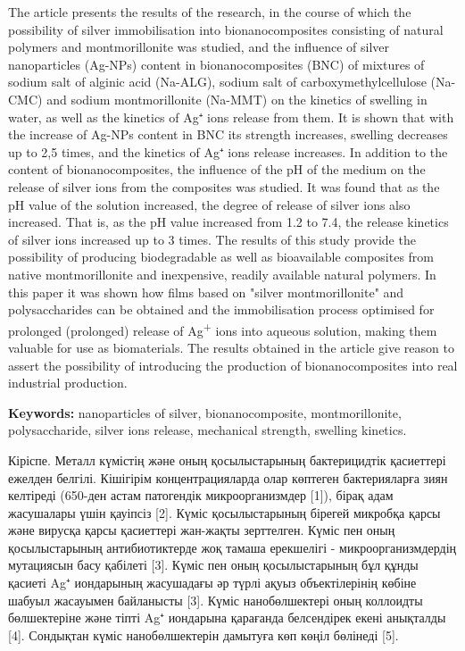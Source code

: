 The article presents the results of the research, in the course of which
the possibility of silver immobilisation into bionanocomposites
consisting of natural polymers and montmorillonite was studied, and the
influence of silver nanoparticles (Ag-NPs) content in bionanocomposites
(BNC) of mixtures of sodium salt of alginic acid (Na-ALG), sodium salt
of carboxymethylcellulose (Na-CMC) and sodium montmorillonite (Na-MMT)
on the kinetics of swelling in water, as well as the kinetics of Ag⁺
ions release from them. It is shown that with the increase of Ag-NPs
content in BNC its strength increases, swelling decreases up to 2,5
times, and the kinetics of Ag⁺ ions release increases. In addition to
the content of bionanocomposites, the influence of the pH of the medium
on the release of silver ions from the composites was studied. It was
found that as the pH value of the solution increased, the degree of
release of silver ions also increased. That is, as the pH value
increased from 1.2 to 7.4, the release kinetics of silver ions increased
up to 3 times. The results of this study provide the possibility of
producing biodegradable as well as bioavailable composites from native
montmorillonite and inexpensive, readily available natural polymers. In
this paper it was shown how films based on "silver montmorillonite" and
polysaccharides can be obtained and the immobilisation process optimised
for prolonged (prolonged) release of Ag\textsuperscript{+} ions into
aqueous solution, making them valuable for use as biomaterials. The
results obtained in the article give reason to assert the possibility of
introducing the production of bionanocomposites into real industrial
production.

{\bfseries Keywords:} nanoparticles of silver, bionanocomposite,
montmorillonite, polysaccharide, silver ions release, mechanical
strength, swelling kinetics.

Кіріспе. Металл күмістің және оның қосылыстарының бактерицидтік
қасиеттері ежелден белгілі. Кішігірім концентрацияларда олар көптеген
бактерияларға зиян келтіреді (650-ден астам патогендік микроорганизмдер
{[}1{]}), бірақ адам жасушалары үшін қауіпсіз {[}2{]}. Күміс
қосылыстарының бірегей микробқа қарсы және вирусқа қарсы қасиеттері
жан-жақты зерттелген. Күміс пен оның қосылыстарының антибиотиктерде жоқ
тамаша ерекшелігі - микроорганизмдердің мутациясын басу қабілеті
{[}3{]}. Күміс пен оның қосылыстарының бұл құнды қасиеті Ag⁺ иондарының
жасушадағы әр түрлі ақуыз объектілерінің көбіне шабуыл жасауымен
байланысты {[}3{]}. Күміс нанобөлшектері оның коллоидты бөлшектеріне
және тіпті Ag⁺ иондарына қарағанда белсендірек екені анықталды {[}4{]}.
Сондықтан күміс нанобөлшектерін дамытуға көп көңіл бөлінеді {[}5{]}.

